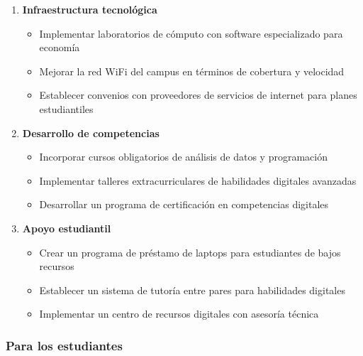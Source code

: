 \documentclass[12pt, a4paper]{article}
\begin{document}
\begin{enumerate}
    \item \textbf{Infraestructura tecnológica}
    \begin{itemize}
        \item Implementar laboratorios de cómputo con software especializado para economía
        \item Mejorar la red WiFi del campus en términos de cobertura y velocidad
        \item Establecer convenios con proveedores de servicios de internet para planes estudiantiles
    \end{itemize}

    \item \textbf{Desarrollo de competencias}
    \begin{itemize}
        \item Incorporar cursos obligatorios de análisis de datos y programación
        \item Implementar talleres extracurriculares de habilidades digitales avanzadas
        \item Desarrollar un programa de certificación en competencias digitales
    \end{itemize}

    \item \textbf{Apoyo estudiantil}
    \begin{itemize}
        \item Crear un programa de préstamo de laptops para estudiantes de bajos recursos
        \item Establecer un sistema de tutoría entre pares para habilidades digitales
        \item Implementar un centro de recursos digitales con asesoría técnica
    \end{itemize}
\end{enumerate}

\subsubsection{Para los estudiantes}
\end{document}
